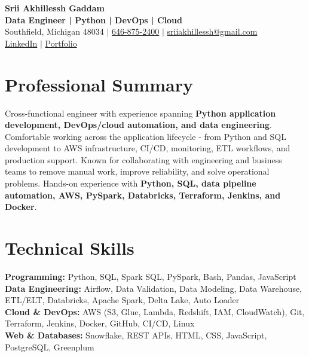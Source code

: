 \documentclass[letterpaper,10pt]{article}
\begin{document}
\fontsize{9.35pt}{10.45pt}\selectfont

\begin{center}
    {\LARGE \textbf{Srii Akhillessh Gaddam}} \\[-1pt]
    \textbf{Data Engineer | Python | DevOps | Cloud} \\[2pt]
    Southfield, Michigan 48034 $|$
    \href{tel:6468752400}{646-875-2400} $|$
    \href{mailto:sriiakhillessh@gmail.com}{sriiakhillessh@gmail.com} \\[1pt]
    \href{https://www.linkedin.com/in/srii-akhiilessh-gaddam-b48668191/}{LinkedIn} $|$
    \href{https://sriiakhillesshg.github.io/portfolio/}{Portfolio}
\end{center}
\vspace{-8pt}

\section{Professional Summary}
\small{Cross-functional engineer with experience spanning \textbf{Python application development, DevOps/cloud automation, and data engineering}. Comfortable working across the application lifecycle - from Python and SQL development to AWS infrastructure, CI/CD, monitoring, ETL workflows, and production support. Known for collaborating with engineering and business teams to remove manual work, improve reliability, and solve operational problems. Hands-on experience with \textbf{Python, SQL, data pipeline automation, AWS, PySpark, Databricks, Terraform, Jenkins, and Docker}.}

\section{Technical Skills}
\small{
\textbf{Programming:} Python, SQL, Spark SQL, PySpark, Bash, Pandas, JavaScript \\
\textbf{Data Engineering:} Airflow, Data Validation, Data Modeling, Data Warehouse, ETL/ELT, Databricks, Apache Spark, Delta Lake, Auto Loader \\
\textbf{Cloud \& DevOps:} AWS (S3, Glue, Lambda, Redshift, IAM, CloudWatch), Git, Terraform, Jenkins, Docker, GitHub, CI/CD, Linux \\
\textbf{Web \& Databases:} Snowflake, REST APIs, HTML, CSS, JavaScript, PostgreSQL, Greenplum
}
\end{document}
